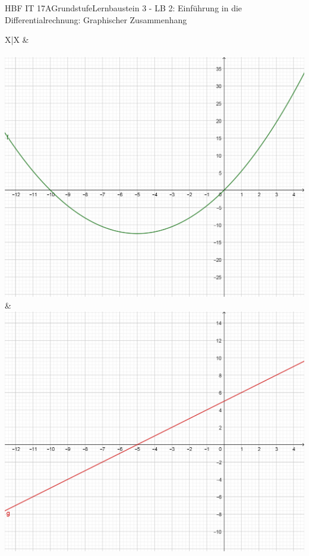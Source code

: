 \documentclass[oneside,openany,headings=optiontotoc,11pt,numbers=noenddot]{scrreprt}
\begin{document}
	\begin{worksheet}{HBF IT 17A}{Grundstufe}{Lernbaustein 3 - LB 2: Einführung in die Differentialrechnung: Graphischer Zusammenhang}
		
		\noindent
		\begin{framed}
			\begin{center}
				\begin{tabularx}{\textwidth}{X|X}
					 & \\
					\\
					\includegraphics[scale=0.25]{Bilder/f.png} & \includegraphics[scale=0.25]{Bilder/f'.png}\\
				\end{tabularx}
			\end{center}
		\end{framed}
	

\end{worksheet}
\end{document}
